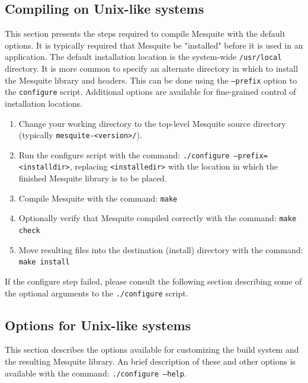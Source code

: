 \subsection{Compiling on Unix-like systems}
This section presents the steps required to compile Mesquite with the default
options.  It is typically required
that Mesquite be "installed" before it is used in an application.  The default 
installation location is the system-wide \texttt{/usr/local} directory.  
It is more common to specify an alternate directory in which to install 
the Mesquite library and headers.  This can be done using the \texttt{--prefix}
option to the \texttt{configure} script.  Additional options are available for
fine-grained control of installation locations.
\begin{enumerate}
\item Change your working directory to the top-level Mesquite source
      directory (typically \texttt{mesquite-<version>/}).
\item Run the configure script with the command: \texttt{./configure --prefix=<installdir>},
      replacing \texttt{<installedir>} with the location in which the finished
      Mesquite library is to be placed.
\item Compile Mesquite with the command: \texttt{make} 
\item Optionally verify that Mesquite compiled correctly with the command: \texttt{make check}
\item Move resulting files into the destination (install) directory with the command: \texttt{make install}
\end{enumerate}
If the configure step failed, please consult the following section describing 
some of the optional arguments to the \texttt{./configure} script. 
\subsection{Options for Unix-like systems}
This section describes the options available for customizing the build
system and the resulting Mesquite library.  An brief description of these
and other options is available with the command: \texttt{./configure --help}.

